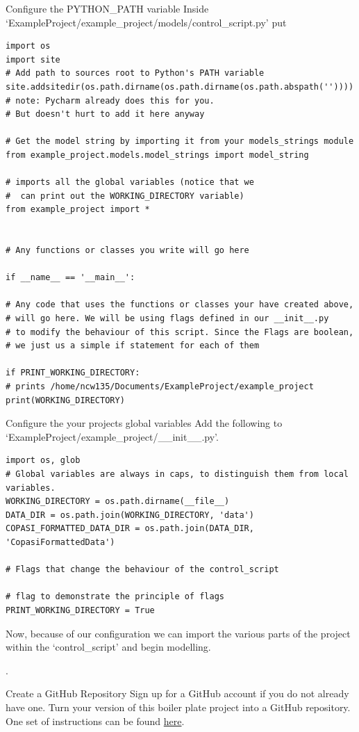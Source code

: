 \documentclass[../main]{subfiles}
\begin{document}
\begin{Task}{Configure the PYTHON\_PATH variable}
Inside `ExampleProject/example\_project/models/control\_script.py' put

\begin{verbatim}
import os
import site
# Add path to sources root to Python's PATH variable
site.addsitedir(os.path.dirname(os.path.dirname(os.path.abspath(''))))
# note: Pycharm already does this for you.
# But doesn't hurt to add it here anyway

# Get the model string by importing it from your models_strings module
from example_project.models.model_strings import model_string

# imports all the global variables (notice that we
#  can print out the WORKING_DIRECTORY variable)
from example_project import *


# Any functions or classes you write will go here

if __name__ == '__main__':

# Any code that uses the functions or classes your have created above,
# will go here. We will be using flags defined in our __init__.py
# to modify the behaviour of this script. Since the Flags are boolean,
# we just us a simple if statement for each of them

if PRINT_WORKING_DIRECTORY:
# prints /home/ncw135/Documents/ExampleProject/example_project
print(WORKING_DIRECTORY)

\end{verbatim}
\end{Task}

\begin{Task}{Configure the your projects global variables}
Add the following to `ExampleProject/example\_project/\_\_init\_\_.py'.
\begin{verbatim}
import os, glob
# Global variables are always in caps, to distinguish them from local variables.
WORKING_DIRECTORY = os.path.dirname(__file__)
DATA_DIR = os.path.join(WORKING_DIRECTORY, 'data')
COPASI_FORMATTED_DATA_DIR = os.path.join(DATA_DIR, 'CopasiFormattedData')

# Flags that change the behaviour of the control_script

# flag to demonstrate the principle of flags
PRINT_WORKING_DIRECTORY = True

\end{verbatim}
\end{Task}

Now, because of our configuration we can import the various parts of the project
within the `control\_script' and begin modelling.

.

\begin{Task}{Create a GitHub Repository}
Sign up for a GitHub account if you do not already have one. Turn your version of this boiler plate
project into a GitHub repository. One set of instructions can be found
\href{https://help.github.com/en/github/getting-started-with-github/create-a-repo}{here}.
\end{Task}
\end{document}

